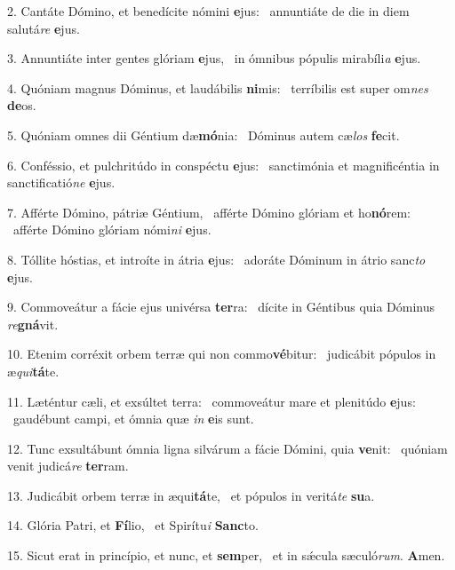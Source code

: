 2. Cantáte Dómino, et benedícite nómini \textbf{e}jus: \ast\  annuntiáte de die in diem salutá\textit{re} \textbf{e}jus.\

3. Annuntiáte inter gentes glóriam \textbf{e}jus, \ast\  in ómnibus pópulis mirabíli\textit{a} \textbf{e}jus.\

4. Quóniam magnus Dóminus, et laudábilis \textbf{ni}mis: \ast\  terríbilis est super om\textit{nes} \textbf{de}os.\

5. Quóniam omnes dii Géntium dæ\textbf{mó}nia: \ast\  Dóminus autem cæ\textit{los} \textbf{fe}cit.\

6. Conféssio, et pulchritúdo in conspéctu \textbf{e}jus: \ast\  sanctimónia et magnificéntia in sanctificatió\textit{ne} \textbf{e}jus.\

7. Afférte Dómino, pátriæ Géntium, \dag\  afférte Dómino glóriam et ho\textbf{nó}rem: \ast\  afférte Dómino glóriam nómi\textit{ni} \textbf{e}jus.\

8. Tóllite hóstias, et introíte in átria \textbf{e}jus: \ast\  adoráte Dóminum in átrio sanc\textit{to} \textbf{e}jus.\

9. Commoveátur a fácie ejus univérsa \textbf{ter}ra: \ast\  dícite in Géntibus quia Dóminus \textit{re}\textbf{gná}vit.\

10. Etenim corréxit orbem terræ qui non commo\textbf{vé}bitur: \ast\  judicábit pópulos in æ\textit{qui}\textbf{tá}te.\

11. Læténtur cæli, et exsúltet terra: \dag\  commoveátur mare et plenitúdo \textbf{e}jus: \ast\  gaudébunt campi, et ómnia quæ \textit{in} \textbf{e}is sunt.\

12. Tunc exsultábunt ómnia ligna silvárum a fácie Dómini, quia \textbf{ve}nit: \ast\  quóniam venit judicá\textit{re} \textbf{ter}ram.\

13. Judicábit orbem terræ in æqui\textbf{tá}te, \ast\  et pópulos in veritá\textit{te} \textbf{su}a.\

14. Glória Patri, et \textbf{Fí}lio, \ast\  et Spirítu\textit{i} \textbf{Sanc}to.\

15. Sicut erat in princípio, et nunc, et \textbf{sem}per, \ast\  et in sǽcula sæculó\textit{rum}. \textbf{A}men.\

